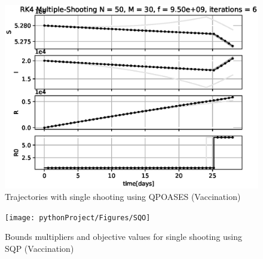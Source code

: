 \begin{figure}[H]
    \centering
    \includegraphics[width=.8\textwidth]{pythonProject/Figures/Multiple_Shooting_Trajectory_SQP_Social_Distancing.eps}
    \caption{Trajectories with single shooting using QPOASES (Vaccination)}
    \label{fig:SH_Traj_SQP_V}
\end{figure}

\begin{figure}[H]
    \centering
    \texttt{[image: pythonProject/Figures/SQO]}
    \caption{Bounds multipliers and objective values for single shooting using SQP (Vaccination)}
    \label{fig:SH_con_obj_SQP_V}
\end{figure}